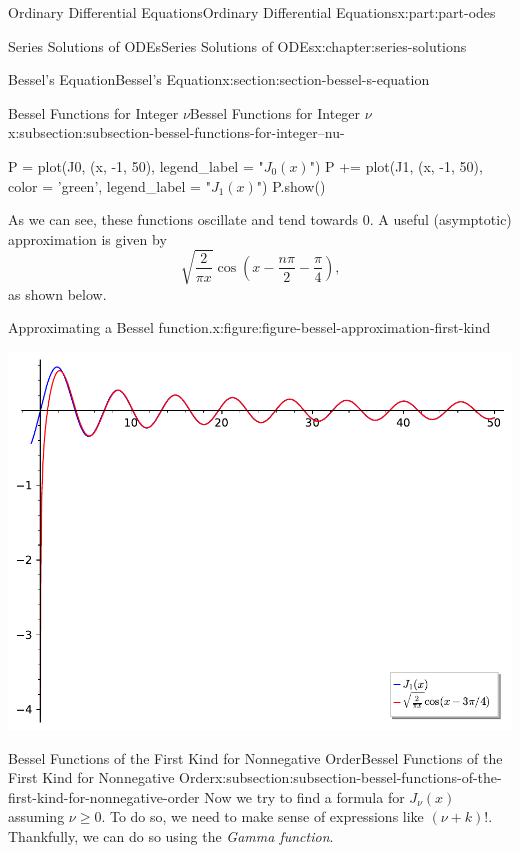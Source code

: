 \documentclass[twoside,10pt,]{book}
\numberwithin{equation}{part}
\begin{document}
\begin{partptx}{Ordinary Differential Equations}{}{Ordinary Differential Equations}{}{}{x:part:part-odes}
\begin{chapterptx}{Series Solutions of ODEs}{}{Series Solutions of ODEs}{}{}{x:chapter:series-solutions}
\begin{sectionptx}{Bessel's Equation}{}{Bessel's Equation}{}{}{x:section:section-bessel-s-equation}
\begin{subsectionptx}{Bessel Functions for Integer \(\nu\)}{}{Bessel Functions for Integer \(\nu\)}{}{}{x:subsection:subsection-bessel-functions-for-integer--nu-}
\begin{sageinput}
P = plot(J0, (x, -1, 50), legend_label = "$J_{0}(x)$")
P += plot(J1, (x, -1, 50), color = 'green', legend_label = "$J_{1}(x)$")
P.show()
\end{sageinput}
As we can see, these functions oscillate and tend towards \(0\). A useful (asymptotic) approximation is given by%
\begin{equation}
\sqrt{\frac{2}{\pi x}}\cos\left(x - \frac{n\pi}{2} - \frac{\pi}{4}\right)\text{,}\label{x:men:equation-bessel-asymptotic}
\end{equation}
as shown below.%
\begin{figureptx}{Approximating a Bessel function.}{x:figure:figure-bessel-approximation-first-kind}{}%
\centering
\tcblower
\end{figureptx}%
\begin{image}{0}{1}{0}%
\includegraphics[width=\linewidth]{generated/sageplot/image-bessel-approximation-first-kind.pdf}%
\end{image}%
\end{subsectionptx}
%
%
\typeout{************************************************}
\typeout{************************************************}
%
\begin{subsectionptx}{Bessel Functions of the First Kind for Nonnegative Order}{}{Bessel Functions of the First Kind for Nonnegative Order}{}{}{x:subsection:subsection-bessel-functions-of-the-first-kind-for-nonnegative-order}
Now we try to find a formula for \(J_{\nu}(x)\) assuming \(\nu\geq0\). To do so, we need to make sense of expressions like \((\nu + k)!\). Thankfully, we can do so using the \emph{Gamma function}.%

\end{subsectionptx}
\end{sectionptx}
\end{chapterptx}
\end{partptx}
\end{document}
